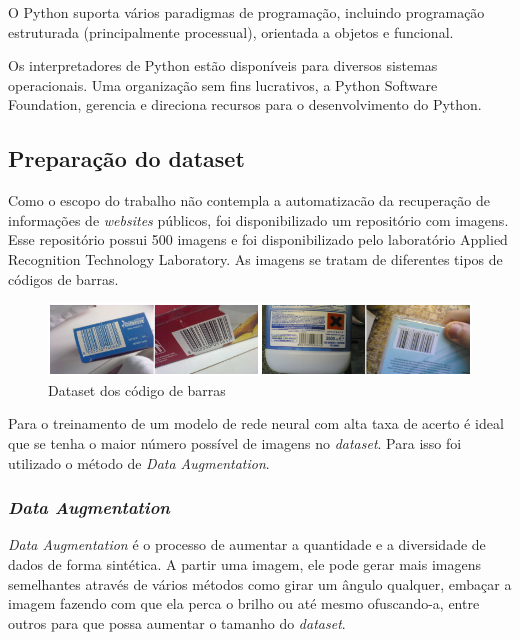 O Python suporta vários paradigmas de programação, incluindo programação estruturada (principalmente processual), orientada a objetos e funcional.

Os interpretadores de Python estão disponíveis para diversos sistemas operacionais. Uma organização sem fins lucrativos, a Python Software Foundation, gerencia e direciona recursos para o desenvolvimento do Python. \cite{van2007python}


\subsection{Preparação do dataset}

Como o escopo do trabalho não contempla a automatizacão da recuperação de informações de \textit{websites} públicos, foi disponibilizado um repositório com imagens. Esse
repositório possui 500 imagens e foi disponibilizado pelo laboratório Applied Recognition Technology Laboratory. As imagens se tratam de diferentes tipos de códigos de barras.\cite{Arte-Lab}

\begin{figure}[htbp]
	\centering
	\includegraphics[width=1\linewidth]{figuras/MachineLearning/barcodes.png}
	\caption{Dataset dos código de barras}
	\label{fig:datasetBarcode}
\end{figure}

Para o treinamento de um modelo de rede neural com alta taxa de acerto é ideal que se tenha o maior número possível de imagens no \textit{dataset}. Para isso foi utilizado o método de \textit{Data Augmentation}.  


\subsubsection*{\textit{Data Augmentation}}\label{sec:dataAugm}

\textit{Data Augmentation} é o processo de aumentar a quantidade e a diversidade de dados de forma sintética. A partir uma imagem, ele pode gerar mais imagens semelhantes através de vários métodos como girar um ângulo qualquer, embaçar a imagem fazendo com que ela perca o brilho ou até mesmo ofuscando-a, entre outros para que possa aumentar o tamanho do \textit{dataset}.

